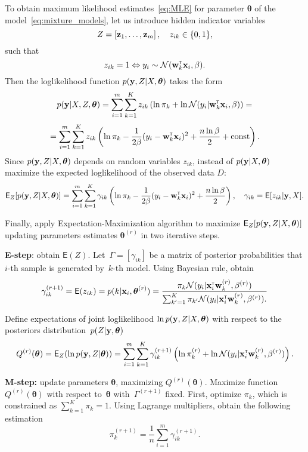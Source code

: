 \documentclass[12pt]{article}
\renewcommand{\bs}{\boldsymbol{\theta}}
\begin{document}
To obtain maximum likelihood estimates~\eqref{eq:MLE} for parameter $\bs$ of the model~\eqref{eq:mixture_models}, let us introduce hidden indicator variables
\[Z = \left[{\mathbf{z}}_1,\dots,{\mathbf{z}}_m\right], \quad z_{ik}\in \{0,1\},\] such that
\[z_{ik} = 1 \Leftrightarrow y_i\sim\mathcal{N}({\mathbf{w}}_k^{\text{\tiny\sffamily\upshape\mdseries T}}{\mathbf{x}}_i, \beta).\]
Then the loglikelihood function $p(\by, Z|X, \bs)$ takes the form
\[p(\by|X, Z, \bs) = \sum_{i=1}^{m}\sum_{k=1}^{K} z_{ik} \left( \ln\pi_k + \ln\mathcal{N}(y_i|\w\T_{k}\x_i,\beta) \right) = \]
\[=\sum_{i=1}^{m}\sum_{k=1}^{K} z_{ik} \left( \ln\pi_k - \frac{1}{2\beta}(y_i-{\mathbf{w}}^{\text{\tiny\sffamily\upshape\mdseries T}}_{k}{\mathbf{x}}_i)^2 + \frac{n\ln{\beta}}{2} + \text{const}\right).\]
Since $p(\by, Z|X, \bs)$ depends on random variables $z_{ik}$, instead of $p(\by|X, \bs)$ maximize the expected loglikelihood of the observed data $D$:
\[\mathsf{E}_{Z} [p(\y, Z|X, \bs)] = \sum_{i=1}^{m}\sum_{k=1}^{K} \gamma_{ik} \left( \ln\pi_k - \frac{1}{2\beta}(y_i-\w\T_{k}\x_i)^2 + \frac{n\ln{\beta}}{2}\right), \quad \gamma_{ik} = \mathsf{E}[z_{ik}|\y, X].\]


Finally, apply Expectation-Maximization algorithm to maximize $\mathsf{E}_{Z} [p(\y, Z|X, \bs)]$ updating parameters estimates $\bs^{(r)}$ in two iterative steps.


{\bf E-step}: obtain $\mathsf{E}(Z)$. Let~$\Gamma=[\gamma_{ik}]$ be a matrix of posterior probabilities that $i$-th sample is generated by~$k$-th model. Using Bayesian rule, obtain
\begin{equation}\label{eq:hidden_vars_Estep}
\gamma_{ik}^{(r+1)} = \mathsf{E}(z_{ik}) = p(k|\x_i, \bs^{(r)}) =
    \frac{
        \pi_k\mathcal{N}(y_i|\x_i\T\w^{(r)}_{k}, \beta^{(r)})
        }{
        \sum_{k'=1}^{K}\pi_{k'}\mathcal{N}(y_i|\x_i\T\w^{(r)}_{k}, \beta^{(r)}).
        }
\end{equation}

Define expectations of joint loglikelihood $\ln p(\y, Z|X, \bs)$ with respect to the posteriors distribution~$p(Z|\y,\bs)$
\begin{equation}\label{eq:posterior}
Q^{(r)}(\bs) = \mathsf{E}_Z(\ln p(\y, Z|\bs)) = \sum_{i=1}^m\sum_{k=1}^K\gamma_{ik}^{(r+1)}
    \left(
        \ln\pi^{(r)}_k+\ln\mathcal{N}(y_i|\x_i\T\w^{(r)}_{k},\beta^{(r)})
    \right).
\end{equation}

{\bf M-step:} update parameters $\bs$, maximizing $Q^{(r)}(\bs)$. Maximize function~$Q^{(r)}(\bs)$ with respect to~$\bs$ with~$\Gamma^{(r+1)}$ fixed. First, optimize $\pi_k$, which is constrained as $\sum_{k=1}^K\pi_k=1$. Using Lagrange multipliers, obtain the following estimation
\[
\pi^{(r+1)}_k = \frac{1}{n}\sum_{i=1}^m { \gamma_{ik}^{(r+1)}}.
\]
\end{document}
